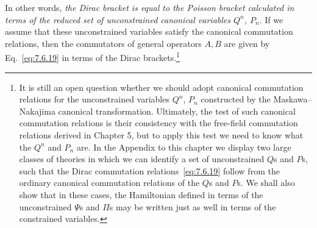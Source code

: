 In other words, \emph{the Dirac bracket is equal to the Poisson bracket
calculated in terms of the reduced set of unconstrained canonical variables
$Q^n$, $P_n$}. If we assume that these unconstrained variables satisfy the
canonical commutation relations, then the commutators of general operators
$A,B$ are given by Eq.~\eqref{eq:7.6.19} in terms of the Dirac brackets.\footnote{It is
still an open question whether we should adopt canonical commutation relations
for the unconstrained variables $Q^n$, $P_n$ constructed by the
Maskawa--Nakajima canonical transformation. Ultimately, the test of such
canonical commutation relations is their consistency with the free-field
commutation relations derived in Chapter 5, but to apply this test we need to
know what the $Q^n$ and $P_n$ are. In the Appendix to this chapter we display
two large classes of theories in which we can identify a set of unconstrained
$Q$s and $P$s, such that the Dirac commutation relations~\eqref{eq:7.6.19} follow from
the ordinary canonical commutation relations of the $Q$s and $P$s. We shall
also show that in these cases, the Hamiltonian defined in terms of the
unconstrained $\Psi$s and $\Pi$s may be written just as well in terms of the
constrained variables.}

